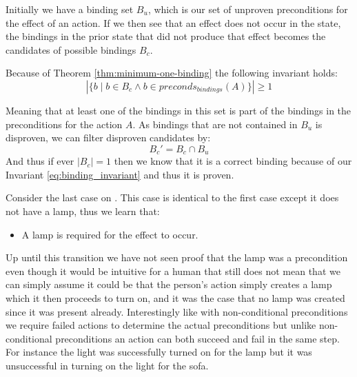 \documentclass[../Master.tex]{subfiles}
\begin{document}
Initially we have a binding set $B_u$, which is our set of unproven preconditions for the effect of an action.
If we then see that an effect does not occur in the state, the bindings in the prior state that did not produce that effect becomes the candidates of possible bindings $B_c$.

Because of Theorem \ref{thm:minimum-one-binding} the following invariant holds:
\begin{equation} \label{eq:binding_invariant}
\left| \{b  \mid  b \in B_c \land b \in preconds_{bindings}(A)\} \right|  \ge 1
\end{equation}


Meaning that at least one of the bindings in this set is part of the bindings in the preconditions for the action $A$. As bindings that are not contained in $B_u$ is disproven, we can filter disproven candidates by:
\begin{equation}
B_c' = B_c \cap B_u
\end{equation}
And thus if ever $|B_c| = 1$ then we know that it is a correct binding because of our Invariant \ref{eq:binding_invariant} and thus it is proven.

 \begin{example}\label{ex:ca:light-on-3}
 Consider the last case on . This case is identical
to the first case except it does not have a lamp, thus we learn that:
\begin{itemize}
	\item A lamp is required for the effect to occur.
\end{itemize}
Up until this transition we have not seen proof that the lamp was a precondition even though it would be intuitive for a human that still
does not mean that we can simply assume it could be that the person's action simply creates a
lamp which it then proceeds to turn on, and it was the case that no
lamp was created since it was present already.
Interestingly like with non-conditional preconditions we require failed actions to determine the actual preconditions but unlike non-conditional preconditions an action can both succeed and fail in the same step. For instance the light was successfully turned on for the lamp but it was unsuccessful in turning on the light for the sofa.

\end{example}
\end{document}
